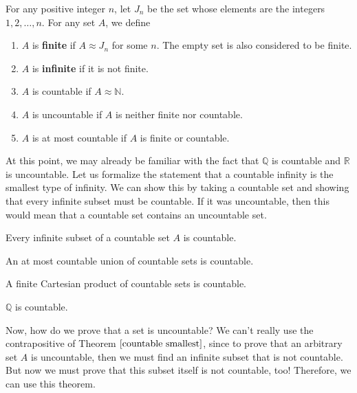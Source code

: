 \documentclass{article}
\begin{document}
  \begin{definition}
    For any positive integer $n$, let $J_n$ be the set whose elements are the integers $1, 2, \ldots, n$. For any set $A$, we define 
    \begin{enumerate}
      \item $A$ is \textbf{finite} if $A \approx J_n$ for some $n$. The empty set is also considered to be finite. 
      \item $A$ is \textbf{infinite} if it is not finite. 
      \item $A$ is countable if $A \approx \mathbb{N}$. 
      \item $A$ is uncountable if $A$ is neither finite nor countable. 
      \item $A$ is at most countable if $A$ is finite or countable. 
    \end{enumerate}
  \end{definition}

  At this point, we may already be familiar with the fact that $\mathbb{Q}$ is countable and $\mathbb{R}$ is uncountable. Let us formalize the statement that a countable infinity is the smallest type of infinity. We can show this by taking a countable set and showing that every infinite subset must be countable. If it was uncountable, then this would mean that a countable set contains an uncountable set. 

  \begin{theorem}
    \label{countable smallest}
    Every infinite subset of a countable set $A$ is countable. 
  \end{theorem}

  \begin{theorem}
    An at most countable union of countable sets is countable. 
  \end{theorem}

  \begin{theorem}
    A finite Cartesian product of countable sets is countable. 
  \end{theorem}

  \begin{corollary}
    $\mathbb{Q}$ is countable. 
  \end{corollary}

  Now, how do we prove that a set is uncountable? We can't really use the contrapositive of Theorem $\ref{countable smallest}$, since to prove that an arbitrary set $A$ is uncountable, then we must find an infinite subset that is not countable. But now we must prove that this subset itself is not countable, too! Therefore, we can use this theorem. 
\end{document}
